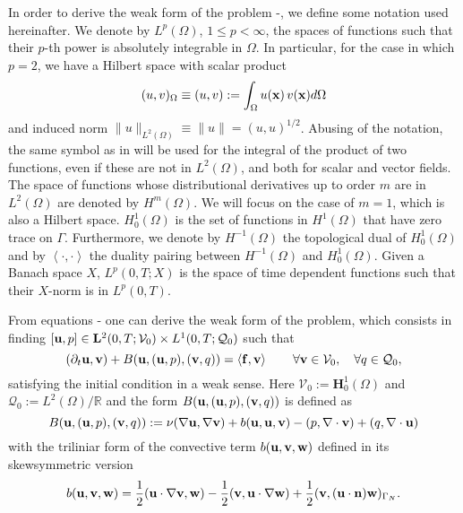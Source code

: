 In order to derive the weak form of the problem -, we define some notation used hereinafter. We denote by $L^p(\Omega)$, $1\leq p<\infty$, the spaces of functions such that their $p$-th power is absolutely integrable in $\Omega$. In particular, for the case in which $p=2$, we have a Hilbert space with scalar product 
\begin{equation}
\label{eq-C7_scalar_product}
(u,v)_\Omega\equiv(u,v):=\int_\Omega u({\bf x}) \, v({\bf x})d\Omega
\end{equation}
and induced norm $\|u\|_{L^2(\Omega)}\equiv\|u\|=(u,u)^{1/2}$. Abusing of the notation, the same symbol as in  will be used for the integral of the product of two functions, even if these are not in $L^2(\Omega)$, and both for scalar and vector fields. The space of functions whose distributional derivatives up to order $m$ are in $L^2(\Omega)$ are denoted by $H^m(\Omega)$. We will focus on the case of $m=1$, which is also a Hilbert space. $H_0^1(\Omega)$ is the set of functions in $H^1(\Omega)$ that have zero trace on $\Gamma$. Furthermore, we denote by $H^{-1}(\Omega)$ the topological dual of $H_0^1(\Omega)$ and by $\left\langle\cdot,\cdot\right\rangle$ the duality pairing between $H^{-1}(\Omega)$ and $H_0^1(\Omega)$. Given a Banach space $X$,  $L^p(0,T;X)$ is the space of time dependent functions such that their $X$-norm is in $L^p(0,T)$.

From equations - one can derive the weak form of the problem, which consists in finding $[{\bf u},p]\in\mathbf{L}^2(0,T;\mathcal{V}_0)\times L^1(0,T;\mathcal{Q}_0)$ such that
\begin{equation}
\label{eq-C7_NS_weak}
(\partial_t{\bf u},{\bf v})+B({\bf u},({\bf u},p),({\bf v},q)) = \left<{\bf f},{\bf v}\right> 
\quad\quad\forall{\bf v}\in\mathcal{V}_0,\quad\forall q\in\mathcal{Q}_0,
\end{equation}
satisfying the initial condition  in a weak sense. Here $\mathcal{V}_0:=\mathbf{H}_0^1(\Omega)$ and $\mathcal{Q}_0:=L^2(\Omega)/\mathbb{R}$ and the form $B({\bf u},({\bf u},p),({\bf v},q))$ is defined as 
\begin{equation}
\label{eq-C7_bilinear}
B({\bf u},({\bf u},p),({\bf v},q)):=\nu(\nabla{\bf u},\nabla{\bf v})+b({\bf u},{\bf u},{\bf v})-(p,\nabla\cdot{\bf v})+(q,\nabla\cdot{\bf u})
\end{equation}
with the triliniar form of the convective term $b({\bf u},{\bf v},{\bf w})$ defined in its skewsymmetric version
\begin{equation}
\label{eq-C7_conv_skew}
b({\bf u},{\bf v},{\bf w})=\frac{1}{2}({\bf u}\cdot\nabla{\bf v},{\bf w})-\frac{1}{2}({\bf v},{\bf u}\cdot\nabla{\bf w})+\frac{1}{2}({\bf v},({\bf u}\cdot\mathbf{n}){\bf w})_{\Gamma_N}.
\end{equation}

